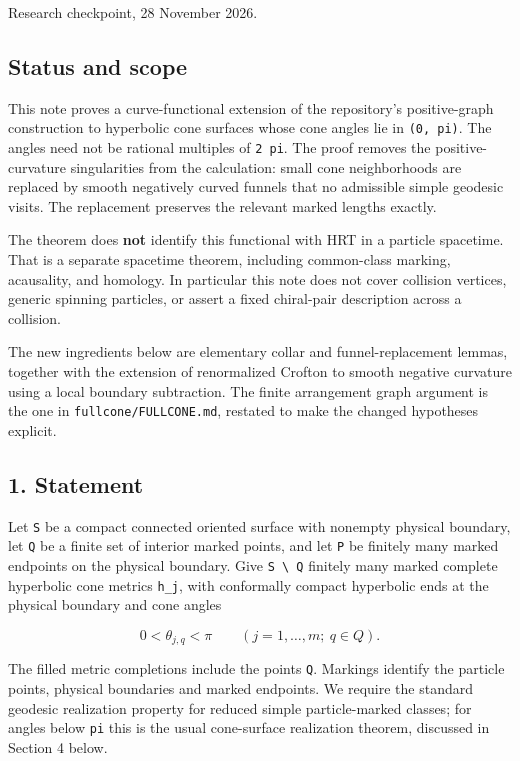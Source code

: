 \documentclass[11pt]{article}
\begin{document}
Research checkpoint, 28 November 2026.

\subsection{Status and scope}\label{status-and-scope}

This note proves a curve-functional extension of the repository's
positive-graph construction to hyperbolic cone surfaces whose cone
angles lie in \texttt{(0,\ pi)}. The angles need not be rational
multiples of \texttt{2\ pi}. The proof removes the positive-curvature
singularities from the calculation: small cone neighborhoods are
replaced by smooth negatively curved funnels that no admissible simple
geodesic visits. The replacement preserves the relevant marked lengths
exactly.

The theorem does \textbf{not} identify this functional with HRT in a
particle spacetime. That is a separate spacetime theorem, including
common-class marking, acausality, and homology. In particular this note
does not cover collision vertices, generic spinning particles, or assert
a fixed chiral-pair description across a collision.

The new ingredients below are elementary collar and funnel-replacement
lemmas, together with the extension of renormalized Crofton to smooth
negative curvature using a local boundary subtraction. The finite
arrangement graph argument is the one in \texttt{fullcone/FULLCONE.md},
restated to make the changed hypotheses explicit.

\subsection{1. Statement}\label{statement-1}

Let \texttt{S} be a compact connected oriented surface with nonempty
physical boundary, let \texttt{Q} be a finite set of interior marked
points, and let \texttt{P} be finitely many marked endpoints on the
physical boundary. Give \texttt{S\ \textbackslash{}\ Q} finitely many
marked complete hyperbolic cone metrics \texttt{h\_\allowbreak j}, with conformally
compact hyperbolic ends at the physical boundary and cone angles

\[
0<\theta_{j,q}<\pi \qquad(j=1,\ldots,m;\ q\in Q).
\]

The filled metric completions include the points \texttt{Q}. Markings
identify the particle points, physical boundaries and marked endpoints.
We require the standard geodesic realization property for reduced simple
particle-marked classes; for angles below \texttt{pi} this is the usual
cone-surface realization theorem, discussed in Section 4 below.
\end{document}
